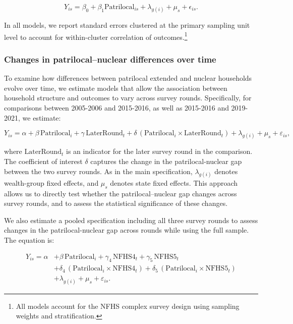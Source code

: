 \documentclass[12pt]{article}
\begin{document}
\begin{equation} \label{eq:controls}
Y_{is} = \beta_0 + \beta_1 \text{Patrilocal}_{is} + \lambda_ {g(i)} + \mu_s + \epsilon_{is}.
\end{equation}

In all models, we report standard errors clustered at the primary sampling unit level to account for within-cluster correlation of outcomes.\footnote{All models account for the NFHS complex survey design using sampling weights and stratification.}

\subsubsection{Changes in patrilocal–nuclear differences over time}

To examine how differences between patrilocal extended and nuclear households evolve over time, we estimate models that allow the association between household structure and outcomes to vary across survey rounds. Specifically, for comparisons between 2005-2006 and 2015-2016, as well as 2015-2016 and 2019-2021, we estimate:

\begin{equation} \label{eq:tworounds}
Y_{is} = \alpha + \beta \,\text{Patrilocal}_i + \gamma \,\text{LaterRound}_t
+ \delta \,(\text{Patrilocal}_i \times \text{LaterRound}_t)
+ \lambda_{g(i)} + \mu_s + \varepsilon_{is},
\end{equation}


where $\text{LaterRound}_t$ is an indicator for the later survey round in the comparison. The coefficient of interest $\delta$ captures the change in the patrilocal-nuclear gap between the two survey rounds. As in the main specification, $\lambda_{g(i)}$ denotes wealth-group fixed effects, and $\mu_s$ denotes state fixed effects. This approach allows us to directly test whether the patrilocal–nuclear gap changes across survey rounds, and to assess the statistical significance of these changes.

We also estimate a pooled specification including all three survey rounds to assess changes in the patrilocal-nuclear gap across rounds while using the full sample. The equation is:

\begin{equation} \label{eq:stacked}
\begin{aligned}
Y_{is} = \alpha 
&+ \beta \,\text{Patrilocal}_i
+ \gamma_4 \,\text{NFHS4}_t
+ \gamma_5 \,\text{NFHS5}_t \\
&+ \delta_4 \,(\text{Patrilocal}_i \times \text{NFHS4}_t)
+ \delta_5 \,(\text{Patrilocal}_i \times \text{NFHS5}_t) \\
&+ \lambda_{g(i)} + \mu_s + \varepsilon_{is}.
\end{aligned}
\end{equation}
\end{document}
